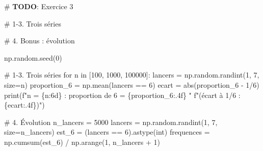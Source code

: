 \documentclass[
  french,
  11pt,
  a4paper,
]{scrbook}
\newenvironment{Shaded}{}{}
\newcommand{\AlertTok}[1]{\textcolor[rgb]{1.00,0.33,0.33}{\textbf{#1}}}
\newcommand{\BuiltInTok}[1]{\textcolor[rgb]{0.84,0.23,0.29}{#1}}
\newcommand{\CommentTok}[1]{\textcolor[rgb]{0.42,0.45,0.49}{#1}}
\newcommand{\ControlFlowTok}[1]{\textcolor[rgb]{0.84,0.23,0.29}{#1}}
\newcommand{\DecValTok}[1]{\textcolor[rgb]{0.00,0.36,0.77}{#1}}
\newcommand{\KeywordTok}[1]{\textcolor[rgb]{0.84,0.23,0.29}{#1}}
\newcommand{\NormalTok}[1]{\textcolor[rgb]{0.14,0.16,0.18}{#1}}
\newcommand{\OperatorTok}[1]{\textcolor[rgb]{0.14,0.16,0.18}{#1}}
\newcommand{\SpecialCharTok}[1]{\textcolor[rgb]{0.00,0.36,0.77}{#1}}
\newcommand{\SpecialStringTok}[1]{\textcolor[rgb]{0.01,0.18,0.38}{#1}}
\begin{document}
\begin{Shaded}
\begin{Highlighting}[]
\CommentTok{\# }\AlertTok{TODO}\CommentTok{: Exercice 3}

\CommentTok{\# 1{-}3. Trois séries}


\CommentTok{\# 4. Bonus : évolution}
\end{Highlighting}
\end{Shaded}

\begin{tcolorbox}[enhanced jigsaw, arc=.35mm, bottomrule=.15mm, bottomtitle=1mm, breakable, colback=white, colbacktitle=quarto-callout-tip-color!10!white, colframe=quarto-callout-tip-color-frame, coltitle=black, left=2mm, leftrule=.75mm, opacityback=0, opacitybacktitle=0.6, rightrule=.15mm, title=\textcolor{quarto-callout-tip-color}{\faLightbulb}\hspace{0.5em}{✅ Voir la correction}, titlerule=0mm, toprule=.15mm, toptitle=1mm]

\begin{Shaded}
\begin{Highlighting}[]
\NormalTok{np.random.seed(}\DecValTok{0}\NormalTok{)}

\CommentTok{\# 1{-}3. Trois séries}
\ControlFlowTok{for}\NormalTok{ n }\KeywordTok{in}\NormalTok{ [}\DecValTok{100}\NormalTok{, }\DecValTok{1000}\NormalTok{, }\DecValTok{100000}\NormalTok{]:}
\NormalTok{    lancers }\OperatorTok{=}\NormalTok{ np.random.randint(}\DecValTok{1}\NormalTok{, }\DecValTok{7}\NormalTok{, size}\OperatorTok{=}\NormalTok{n)}
\NormalTok{    proportion\_6 }\OperatorTok{=}\NormalTok{ np.mean(lancers }\OperatorTok{==} \DecValTok{6}\NormalTok{)}
\NormalTok{    ecart }\OperatorTok{=} \BuiltInTok{abs}\NormalTok{(proportion\_6 }\OperatorTok{{-}} \DecValTok{1}\OperatorTok{/}\DecValTok{6}\NormalTok{)}
    \BuiltInTok{print}\NormalTok{(}\SpecialStringTok{f"n = }\SpecialCharTok{\{}\NormalTok{n}\SpecialCharTok{:6d\}}\SpecialStringTok{ : proportion de 6 = }\SpecialCharTok{\{}\NormalTok{proportion\_6}\SpecialCharTok{:.4f\}}\SpecialStringTok{  "}
          \SpecialStringTok{f"(écart à 1/6 : }\SpecialCharTok{\{}\NormalTok{ecart}\SpecialCharTok{:.4f\}}\SpecialStringTok{)"}\NormalTok{)}

\CommentTok{\# 4. Évolution}
\NormalTok{n\_lancers }\OperatorTok{=} \DecValTok{5000}
\NormalTok{lancers }\OperatorTok{=}\NormalTok{ np.random.randint(}\DecValTok{1}\NormalTok{, }\DecValTok{7}\NormalTok{, size}\OperatorTok{=}\NormalTok{n\_lancers)}
\NormalTok{est\_6 }\OperatorTok{=}\NormalTok{ (lancers }\OperatorTok{==} \DecValTok{6}\NormalTok{).astype(}\BuiltInTok{int}\NormalTok{)}
\NormalTok{frequences }\OperatorTok{=}\NormalTok{ np.cumsum(est\_6) }\OperatorTok{/}\NormalTok{ np.arange(}\DecValTok{1}\NormalTok{, n\_lancers }\OperatorTok{+} \DecValTok{1}\NormalTok{)}


\end{Highlighting}
\end{Shaded}
\end{tcolorbox}
\end{document}
